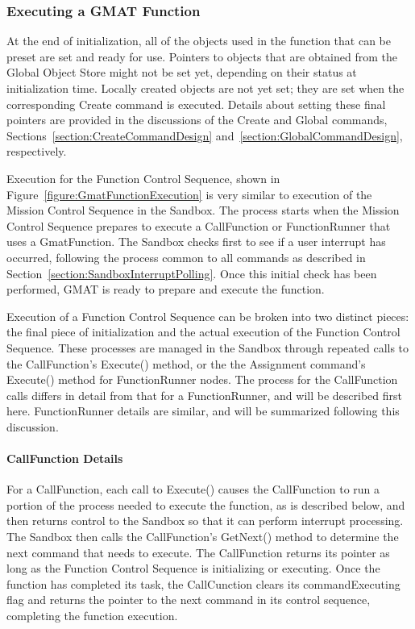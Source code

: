 \subsubsection{Executing a GMAT Function}

At the end of initialization, all of the objects used in the function that can be preset are set and
ready for use.  Pointers to objects that are obtained from the Global Object Store might not be set
yet, depending on their status at initialization time.  Locally created objects are not yet set;
they are set when the corresponding Create command is executed.  Details about setting these final
pointers are provided in the discussions of the Create and Global commands,
Sections~\ref{section:CreateCommandDesign} and~\ref{section:GlobalCommandDesign}, respectively.

Execution for the Function Control Sequence, shown in Figure~\ref{figure:GmatFunctionExecution} is
very similar to execution of the Mission Control Sequence in the Sandbox.  The process starts when
the Mission Control Sequence prepares to execute a CallFunction or FunctionRunner that uses a
GmatFunction. The Sandbox checks first to see if a user interrupt has occurred, following the
process common to all commands as described in Section~\ref{section:SandboxInterruptPolling}. Once
this initial check has been performed, GMAT is ready to prepare and execute the function.

Execution of a Function Control Sequence can be broken into two distinct pieces: the final piece of
initialization and the actual execution of the Function Control Sequence.  These processes are
managed in the Sandbox through repeated calls to the CallFunction's Execute() method, or the the
Assignment command's Execute() method for FunctionRunner nodes.  The process for the CallFunction
calls differs in detail from that for a FunctionRunner, and will be described first here. 
FunctionRunner details are similar, and will be summarized following this discussion.

\paragraph{CallFunction Details} For a CallFunction, each call to Execute() causes the CallFunction
to run a portion of the process needed to execute the function, as is described below, and then
returns control to the Sandbox so that it can perform interrupt processing.  The Sandbox then calls
the CallFunction's GetNext() method to determine the next command that needs to execute.  The
CallFunction returns its pointer as long as the Function Control Sequence is initializing or
executing.  Once the function has completed its task, the CallCunction clears its commandExecuting
flag and returns the pointer to the next command in its control sequence, completing the function
execution.

